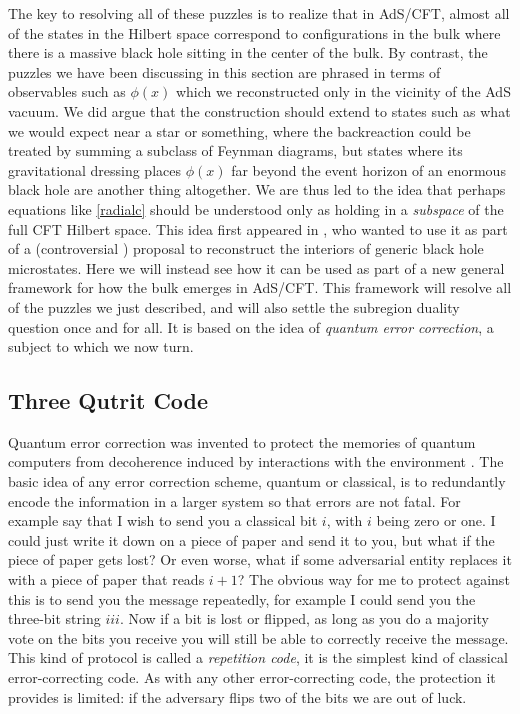 \documentclass[toc]{PoS}
\begin{document}
The key to resolving all of these puzzles is to realize that in AdS/CFT, almost all of the states in the Hilbert space correspond to configurations in the bulk where there is a massive black hole sitting in the center of the bulk.  By contrast, the puzzles we have been discussing in this section are phrased in terms of observables such as $\phi(x)$ which we reconstructed only in the vicinity of the AdS vacuum.  We did argue that the construction should extend to states such as what we would expect near a star or something, where the backreaction could be treated by summing a subclass of Feynman diagrams,  but states where its gravitational dressing places $\phi(x)$ far beyond the event horizon of an enormous black hole are another thing altogether.  We are thus led to the idea that perhaps equations like \eqref{radialc} should be understood only as holding in a \textit{subspace} of the full CFT Hilbert space.  This idea first appeared in \cite{Papadodimas:2013jku}, who wanted to use it as part of a (controversial \cite{Harlow:2014yoa,Papadodimas:2015jra,Marolf:2015dia}) proposal to reconstruct the interiors of generic black hole microstates. Here we will instead see how it can be used as part of a new general framework for how the bulk emerges in AdS/CFT.    This framework will resolve all of the puzzles we just described, and will also settle the subregion duality question once and for all.  It is based on the idea of \textit{quantum error correction}, a subject to which we now turn.

\subsection{Three Qutrit Code}
Quantum error correction was invented to protect the memories of quantum computers from decoherence induced by interactions with the environment \cite{shor1995scheme,Gottesman:1997zz}.  The basic idea of any error correction scheme, quantum or classical, is to redundantly encode the information in a larger system so that errors are not fatal.  For example say that I wish to send you a classical bit $i$, with $i$ being zero or one.  I could just write it down on a piece of paper and send it to you, but what if the piece of paper gets lost?  Or even worse, what if some adversarial entity replaces it with a piece of paper that reads $i+1$?  The obvious way for me to protect against this is to send you the message repeatedly, for example I could send you the three-bit string $iii$.  Now if a bit is lost or flipped, as long as you do a majority vote on the bits you receive you will still be able to correctly receive the message.  This kind of protocol is called a \textit{repetition code}, it is the simplest kind of classical error-correcting code.  As with any other error-correcting code, the protection it provides is limited: if the adversary flips two of the bits we are out of luck.  
\end{document}
